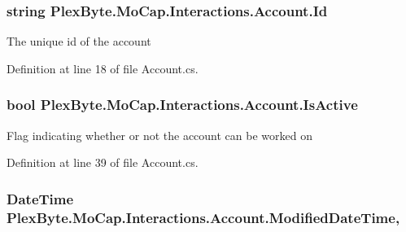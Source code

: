 \subsubsection[{\texorpdfstring{Id}{Id}}]{\setlength{\rightskip}{0pt plus 5cm}string Plex\+Byte.\+Mo\+Cap.\+Interactions.\+Account.\+Id\hspace{0.3cm}{\ttfamily [get]}}\hypertarget{class_plex_byte_1_1_mo_cap_1_1_interactions_1_1_account_a803b3019d6baa78793eeb56e9033028a}{}\label{class_plex_byte_1_1_mo_cap_1_1_interactions_1_1_account_a803b3019d6baa78793eeb56e9033028a}


The unique id of the account 



Definition at line 18 of file Account.\+cs.

\subsubsection[{\texorpdfstring{Is\+Active}{IsActive}}]{\setlength{\rightskip}{0pt plus 5cm}bool Plex\+Byte.\+Mo\+Cap.\+Interactions.\+Account.\+Is\+Active\hspace{0.3cm}{\ttfamily [get]}}\hypertarget{class_plex_byte_1_1_mo_cap_1_1_interactions_1_1_account_adce5e94f1e2ca7340805ad6f601ebe5f}{}\label{class_plex_byte_1_1_mo_cap_1_1_interactions_1_1_account_adce5e94f1e2ca7340805ad6f601ebe5f}


Flag indicating whether or not the account can be worked on 



Definition at line 39 of file Account.\+cs.

\subsubsection[{\texorpdfstring{Modified\+Date\+Time}{ModifiedDateTime}}]{\setlength{\rightskip}{0pt plus 5cm}Date\+Time Plex\+Byte.\+Mo\+Cap.\+Interactions.\+Account.\+Modified\+Date\+Time\hspace{0.3cm}{\ttfamily [get]}, {\ttfamily [set]}}\hypertarget{class_plex_byte_1_1_mo_cap_1_1_interactions_1_1_account_af8af891d5ca86bc5aec5403339aefa76}{}\label{class_plex_byte_1_1_mo_cap_1_1_interactions_1_1_account_af8af891d5ca86bc5aec5403339aefa76}



